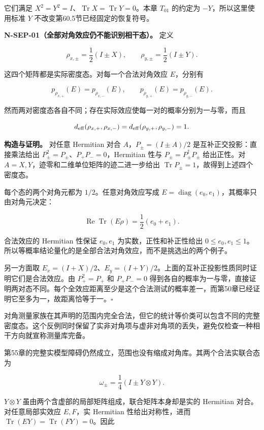 \documentclass[
  11pt,
  oneside]{book}
\begin{document}
它们满足
\(X^2=Y^2=I\)、\(\operatorname{Tr}X=\operatorname{Tr}Y=0\)。本章
\(T_{01}\) 的约定为 \(-Y\)，所以这里使用标准 \(Y\)
不改变第60.5节已经固定的恢复符号。

\protect\hypertarget{n-sep-01}{}{}

\textbf{N-SEP-01（全部对角效应仍不能识别相干态）。} 定义

\[
\rho_{x,\pm}=\frac12(I\pm X),\qquad
\rho_{y,\pm}=\frac12(I\pm Y).
\]

这四个矩阵都是实际密度态。对每一个合法对角效应 \(E\)，分别有

\[
p_{\rho_{x,+}}(E)=p_{\rho_{x,-}}(E),\qquad
p_{\rho_{y,+}}(E)=p_{\rho_{y,-}}(E).
\]

然而两对密度态各自不同；存在实际效应使每一对的概率分别为一与零，而且

\[
d_{\rm eff}(\rho_{x,+},\rho_{x,-})
=d_{\rm eff}(\rho_{y,+},\rho_{y,-})=1.
\]

\textbf{构造与证明。} 对任意 Hermitian 对合 \(A\)，\(P_\pm=(I\pm A)/2\)
是互补正交投影：直接乘法给出 \(P_\pm^2=P_\pm\)、\(P_+P_-=0\)，Hermitian
性与 \(P_\pm=P_\pm^\dagger P_\pm\) 给出正性。对
\(A=X,Y\)，迹零和二维单位矩阵的迹二进一步给出
\(\operatorname{Tr}P_\pm=1\)，故得到上述四个密度态。

每个态的两个对角元都为 \(1/2\)。任意对角效应写成
\(E=\operatorname{diag}(e_0,e_1)\)，其概率只由对角元决定：

\[
\operatorname{Re}\operatorname{Tr}(E\rho)
=\frac12(e_0+e_1).
\]

合法效应的 Hermitian 性保证 \(e_0,e_1\) 为实数，正性和补正性给出
\(0\le e_0,e_1\le1\)。所以等概率结论量化的是全部合法对角效应，而不是挑选出的两个例子。

另一方面取
\(E_x=(I+X)/2\)、\(E_y=(I+Y)/2\)。上面的互补正投影性质同时证明它们是合法效应。由
\(P_+^2=P_+\) 和 \(P_+P_-=0\)
得到各自的概率为一与零，直接证明两对态不同。每个全效应距离至少是这个合法测试的概率差一，而第50章已经证明它至多为一，故距离恰等于一。\(\square\)

对角测量家族在其声明的范围内完全合法，但它的统计等价类可以包含不同的完整密度态。这个反例同时保留了实非对角项与虚非对角项的丢失，避免仅检查一种相干方向就宣称测量库完备。

第55章的完整实模型障碍仍然成立，范围也没有缩成对角库。其两个合法实联合态为

\[
\omega_\pm=\frac14(I\pm Y\otimes Y).
\]

\(Y\otimes Y\) 虽由两个含虚部的局部矩阵组成，联合矩阵本身却是实的
Hermitian 对合。对任意局部实效应 \(E,F\)，实 Hermitian
性给出对称性，进而
\(\operatorname{Tr}(EY)=\operatorname{Tr}(FY)=0\)。因此
\end{document}
